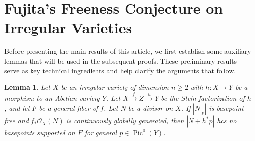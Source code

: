 \documentclass[sn-mathphys-num]{sn-jnl}%
\newtheorem{lemma}[theorem]{Lemma}
\theoremstyle{definition}
\numberwithin{equation}{section}
\begin{document}
\section{Fujita's Freeness Conjecture on Irregular Varieties}\label{sec3}
Before presenting the main results of this article, we first establish some auxiliary lemmas that will be used in the subsequent proofs. These preliminary results serve as key technical ingredients and help clarify the arguments that follow.
\begin{lemma}\label{lemma1}
Let $X$ be an irregular variety of dimension $n\geq 2$ with $h:X \to Y$ be a morphism to an Abelian variety $Y$. Let $X \xrightarrow{f} Z \xrightarrow{u} Y$ be the Stein factorization of $h$, and let $F$ be a general fiber of $f$. Let $N$ be a divisor on $X$. If $|N_{|_{F}}|$ is basepoint-free and $f_{*}\mathcal{O}_{X}(N)$ is continuously globally generated, then $|N + h^{*}p|$ has no basepoints supported on $F$ for general $p \in \operatorname{Pic}^{0}(Y)$.
\end{lemma}
\end{document}
